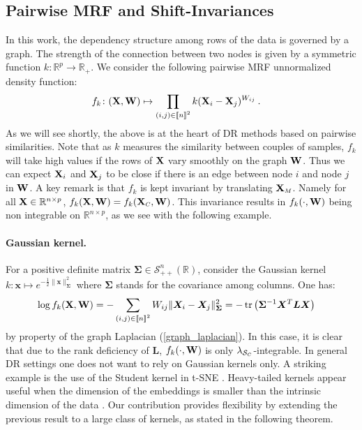 \subsection{Pairwise MRF and Shift-Invariances}\label{sec:within_CC}

In this work, the dependency structure among rows of the data is governed by a graph. The strength of the connection between two nodes is given by a symmetric function $k : \mathbb{R}^p \to \mathbb{R}_+$. We consider the following pairwise MRF unnormalized density function:
\begin{align}\label{eq:unnormalized_MRF}
  f_{k} \colon (\mathbf{X},\mathbf{W}) &\mapsto \prod_{(i,j) \in {[\![n]\!]}^2} k(\mathbf{X}_{i} - \mathbf{X}_{j})^{W_{ij}} \: .
\end{align}
As we will see shortly, the above is at the heart of DR methods based on pairwise similarities. Note that as $k$ measures the similarity between couples of samples, $f_k$ will take high values if the rows of $\mathbf{X}$ vary smoothly on the graph $\mathbf{W}$. Thus we can expect $\mathbf{X}_i$ and $\mathbf{X}_j$ to be close if there is an edge between node $i$ and node $j$ in $\mathbf{W}$. A key remark is that $f_{k}$ is kept invariant by translating $\Xb_{\scaleto{M}{4pt}}$. Namely for all $\mathbf{X} \in \mathbb{R}^{n \times p}$, $f_{k}(\Xb, \Wb) = f_{k}(\Xb_{\scaleto{C}{4pt}}, \Wb)$. This invariance results in $f_{k}(\cdot, \mathbf{W})$ being non integrable on $\mathbb{R}^{n \times p}$, as we see with the following example. 

\paragraph{Gaussian kernel.} For a positive definite matrix $\bm{\Sigma} \in \mathcal{S}^n_{++}(\mathbb{R})$, consider the Gaussian kernel $k : \bm{x} \mapsto e^{- \frac{1}{2}\| \bm{x} \|_{\bm{\Sigma}}^2}$ where $\bm{\Sigma}$ stands for the covariance among columns. One has:
\begin{align}\label{eq:gaussian_kernel}
    \log f_{k}(\mathbf{X}, \mathbf{W}) &= -\sum_{(i,j) \in {[\![n]\!]}^2} W_{ij} \| \bm{X}_{i}-\bm{X}_{j} \|^2_{\bm{\Sigma}}
    = - \operatorname{tr} \left(\bm{\Sigma}^{-1} \bm{X}^{T} \bm{L} \bm{X}\right)
\end{align}
by property of the graph Laplacian (\cref{graph_laplacian}). In this case, it is clear that due to the rank deficiency of $\bm{L}$, $f_{k}(\cdot, \mathbf{W})$ is only $\lambda_{\mathcal{S}_{\scaleto{C}{3pt}}}$-integrable. In general DR settings one does not want to rely on Gaussian kernels only. A striking example is the use of the Student kernel in t-SNE \cite{maaten2008tSNE}. Heavy-tailed kernels appear useful when the dimension of the embeddings is smaller than the intrinsic dimension of the data \cite{kobak2019heavy}. Our contribution provides flexibility by extending the previous result to a large class of kernels, as stated in the following theorem.

